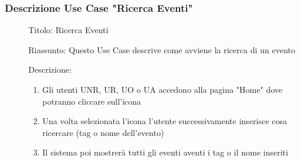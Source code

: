 \documentclass{article}
\begin{document}
\subsubsection*{Descrizione Use Case "Ricerca Eventi"}
\begin{description}
    \item[] Titolo: Ricerca Eventi
    \item[] Riassunto: Questo Use Case descrive come avviene la ricerca di un evento
    \item[] Descrizione:
        \begin{enumerate}
            \item Gli utenti UNR, UR, UO o UA accedono alla pagina "Home" dove potranno cliccare sull'icona 
            \item Una volta selezionata l'icona l'utente successivamente inserisce cosa ricercare (tag o nome dell'evento)
            \item Il sistema poi mostrerà tutti gli eventi aventi i tag o il nome inseriti
        \end{enumerate}
\end{description}
\end{document}
